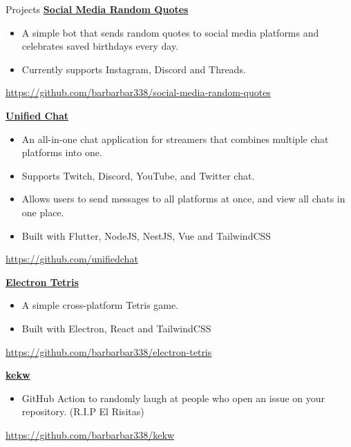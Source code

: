 \begin{rubric}{Projects}
    \entry*[2023]%
        \href{https://github.com/barbarbar338/social-media-random-quotes}{\textbf{Social Media Random Quotes}}
        \begin{itemize}
            \item A simple bot that sends random quotes to social media platforms and celebrates saved birthdays every day.
            \item Currently supports Instagram, Discord and Threads.
        \end{itemize}
        \par \url{https://github.com/barbarbar338/social-media-random-quotes}

    \entry*[2022]%
        \href{https://github.com/unifiedchat}{\textbf{Unified Chat}}
        \begin{itemize}
            \item An all-in-one chat application for streamers that combines multiple chat platforms into one.
            \item Supports Twitch, Discord, YouTube, and Twitter chat.
            \item Allows users to send messages to all platforms at once, and view all chats in one place.
            \item Built with Flutter, NodeJS, NestJS, Vue and TailwindCSS
        \end{itemize}
        \par \url{https://github.com/unifiedchat}

    \entry*[2022]%
        \href{https://github.com/barbarbar338/electron-tetris}{\textbf{Electron Tetris}}
        \begin{itemize}
            \item A simple cross-platform Tetris game.
            \item Built with Electron, React and TailwindCSS
        \end{itemize}
        \par \url{https://github.com/barbarbar338/electron-tetris}

    \entry*[2021]%
        \href{https://github.com/barbarbar338/kekw}{\textbf{kekw}}
        \begin{itemize}
            \item GitHub Action to randomly laugh at people who open an issue on your repository. (R.I.P El Risitas)
        \end{itemize}
        \par \url{https://github.com/barbarbar338/kekw}


\end{rubric}
